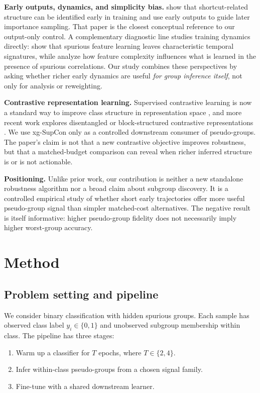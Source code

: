 \documentclass{article}
\begin{document}
\textbf{Early outputs, dynamics, and simplicity bias.}
\citet{yang2024spare} show that shortcut-related structure can be identified early in training and use early outputs to guide later importance sampling. That paper is the closest conceptual reference to our output-only control. A complementary diagnostic line studies training dynamics directly: \citet{murali2023beyond} show that spurious feature learning leaves characteristic temporal signatures, while \citet{qiu2024complexity} analyze how feature complexity influences what is learned in the presence of spurious correlations. Our study combines these perspectives by asking whether richer early dynamics are useful \emph{for group inference itself}, not only for analysis or reweighting.

\textbf{Contrastive representation learning.}
Supervised contrastive learning is now a standard way to improve class structure in representation space \citep{khosla2020supervised}, and more recent work explores disentangled or block-structured contrastive representations \citep{makino2025supervised}. We use xg-SupCon only as a controlled downstream consumer of pseudo-groups. The paper's claim is not that a new contrastive objective improves robustness, but that a matched-budget comparison can reveal when richer inferred structure is or is not actionable.

\textbf{Positioning.}
Unlike prior work, our contribution is neither a new standalone robustness algorithm nor a broad claim about subgroup discovery. It is a controlled empirical study of whether short early trajectories offer more useful pseudo-group signal than simpler matched-cost alternatives. The negative result is itself informative: higher pseudo-group fidelity does not necessarily imply higher worst-group accuracy.

\section{Method}
\label{sec:method}
\subsection{Problem setting and pipeline}
We consider binary classification with hidden spurious groups. Each sample has observed class label $y_i \in \{0,1\}$ and unobserved subgroup membership within class. The pipeline has three stages:
\begin{enumerate}
  \item Warm up a classifier for $T$ epochs, where $T \in \{2,4\}$.
  \item Infer within-class pseudo-groups from a chosen signal family.
  \item Fine-tune with a shared downstream learner.
\end{enumerate}
\end{document}
